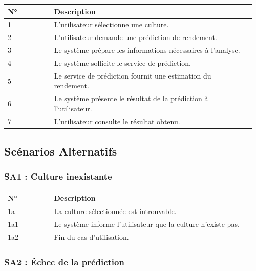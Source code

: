 \begin{longtable}{@{}p{0.18\linewidth}p{0.78\linewidth}@{}}
\toprule
\rowcolors{2}{gray!10}{white}
\textbf{N°} & \textbf{Description} \\
\midrule
\endhead
1 & L'utilisateur sélectionne une culture. \\
2 & L'utilisateur demande une prédiction de rendement. \\
3 & Le système prépare les informations nécessaires à l'analyse. \\
4 & Le système sollicite le service de prédiction. \\
5 & Le service de prédiction fournit une estimation du rendement. \\
6 & Le système présente le résultat de la prédiction à l'utilisateur. \\
7 & L'utilisateur consulte le résultat obtenu. \\
\bottomrule
\end{longtable}

\hypertarget{scuxe9narios-alternatifs-3}{%
\subsection{Scénarios Alternatifs}\label{scuxe9narios-alternatifs-3}}

\hypertarget{sa1-culture-inexistante-1}{%
\subsubsection{SA1 : Culture
inexistante}\label{sa1-culture-inexistante-1}}

\begin{longtable}{@{}p{0.18\linewidth}p{0.78\linewidth}@{}}
\toprule
\rowcolors{2}{gray!10}{white}
\textbf{N°} & \textbf{Description} \\
\midrule
\endhead
1a & La culture sélectionnée est introuvable. \\
1a1 & Le système informe l'utilisateur que la culture n'existe pas. \\
1a2 & Fin du cas d'utilisation. \\
\bottomrule
\end{longtable}

\hypertarget{sa2-uxe9chec-de-la-pruxe9diction}{%
\subsubsection{SA2 : Échec de la
prédiction}\label{sa2-uxe9chec-de-la-pruxe9diction}}

